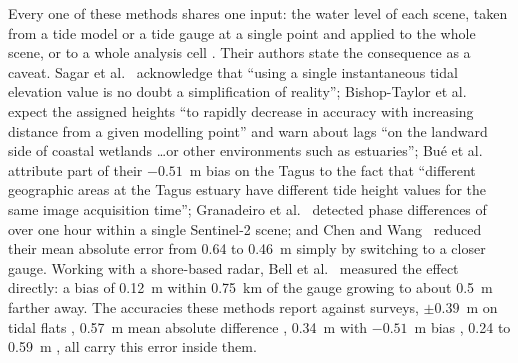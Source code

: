 \documentclass[final,5p,times,number]{elsarticle}
\begin{document}
Every one of these methods shares one input: the water level of each
scene, taken from a tide model or a tide gauge at a single point and
applied to the whole scene, or to a whole analysis cell
\citep{sagar2017,bishoptaylor2019ecss,bue2020,fitton2021,granadeiro2021,chen2025}.
Their authors state the consequence as a caveat. Sagar et al.~\cite{sagar2017}
acknowledge that ``using a single instantaneous tidal elevation value is no
doubt a simplification of reality''; Bishop-Taylor et al.~\cite{bishoptaylor2019ecss} expect
the assigned heights ``to rapidly decrease in accuracy with increasing
distance from a given modelling point'' and warn about lags ``on the
landward side of coastal wetlands \ldots or other environments such as
estuaries''; Bu\'e et al.~\cite{bue2020} attribute part of their $-0.51$~m bias on the
Tagus to the fact that ``different geographic areas at the Tagus estuary
have different tide height values for the same image acquisition time'';
Granadeiro et al.~\cite{granadeiro2021} detected phase differences of over one hour within a
single Sentinel-2 scene; and Chen and Wang~\cite{chen2025} reduced their mean absolute
error from 0.64 to 0.46~m simply by switching to a closer gauge. Working
with a shore-based radar, Bell et al.~\cite{bell2016} measured the effect directly: a
bias of 0.12~m within 0.75~km of the gauge growing to about 0.5~m farther
away. The accuracies these methods report against surveys, $\pm 0.39$~m on
tidal flats \citep{bishoptaylor2019ecss}, 0.57~m mean absolute difference
\citep{sagar2017}, 0.34~m with $-0.51$~m bias \citep{bue2020}, 0.24 to
0.59~m \citep{chen2025}, all carry this error inside them.
\end{document}
